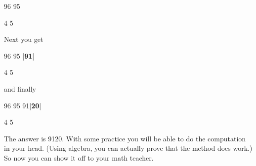 \begin{consolethree}
96 95

4 5
\end{consolethree}

Next you get

\begin{consolethree}[escapeinside=||]
96 95 |\textbf{91}|

4 5
\end{consolethree}

and finally

\begin{consolethree}[escapeinside=||]
96 95 91|\textbf{20}|

4 5
\end{consolethree}

The answer is 9120. With some practice you will be able to do the computation in your head. (Using algebra, you can actually prove that the method does work.) So now you can show it off to your math teacher.

